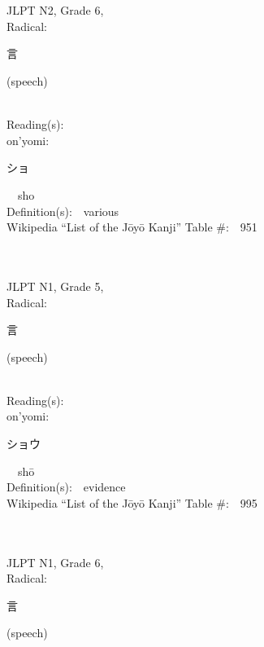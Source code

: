 \begin{multicols}{2}
\ \ \\
{\fontsize{34pt}{40pt}  }\ \ \\  %
{JLPT N2, Grade 6, \\Radical:\ \ {\begin{CJK}{UTF8}{min} 言 \end{CJK}} (speech) } \\
Reading(s):\ \ \\
{\hspace*{1em}}on'yomi:\ \ \\
{\hspace*{2em}}{\begin{CJK}{UTF8}{min} ショ \end{CJK}}\ \ sho\ \ \\
Definition(s):\ \ various \\
Wikipedia ``List of the J\=oy\=o Kanji'' Table \#:\ \ 951 \\
\ \ \\
{\fontsize{34pt}{40pt}  }\ \ \\  %
{JLPT N1, Grade 5, \\Radical:\ \ {\begin{CJK}{UTF8}{min} 言 \end{CJK}} (speech) } \\
Reading(s):\ \ \\
{\hspace*{1em}}on'yomi:\ \ \\
{\hspace*{2em}}{\begin{CJK}{UTF8}{min} ショウ \end{CJK}}\ \ sh\=o\ \ \\
Definition(s):\ \ evidence \\
Wikipedia ``List of the J\=oy\=o Kanji'' Table \#:\ \ 995 \\
\ \ \\
{\fontsize{34pt}{40pt}  }\ \ \\  %
{JLPT N1, Grade 6, \\Radical:\ \ {\begin{CJK}{UTF8}{min} 言 \end{CJK}} (speech) } \\

\end{multicols}
